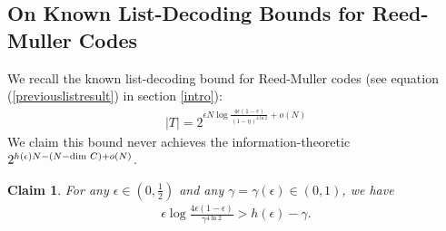 \documentclass[12pt]{article}
\newtheorem{claim}[theorem]{Claim}
\begin{document}
\subsection{On Known List-Decoding Bounds for Reed-Muller Codes}\label{acomparelist}
We recall the known list-decoding bound for Reed-Muller codes (see equation (\ref{previouslistresult}) in section \ref{intro}):
\begin{align*}
    |T|=2^{\epsilon N\log\frac{4\epsilon(1-\epsilon)}{(1-\eta)^{4\ln2}}+o(N)}
\end{align*}
We claim this bound never achieves the information-theoretic $2^{h(\epsilon)N-(N-\textnormal{dim }C)+o(N)}$.
\begin{claim}
For any $\epsilon\in(0,\frac{1}{2})$ and any $\gamma=\gamma(\epsilon)\in (0,1)$, we have
\begin{align*}
    \epsilon \log\frac{4\epsilon(1-\epsilon)}{\gamma^{4\ln2}}>h(\epsilon)-\gamma.
\end{align*}
\end{claim}
\end{document}
